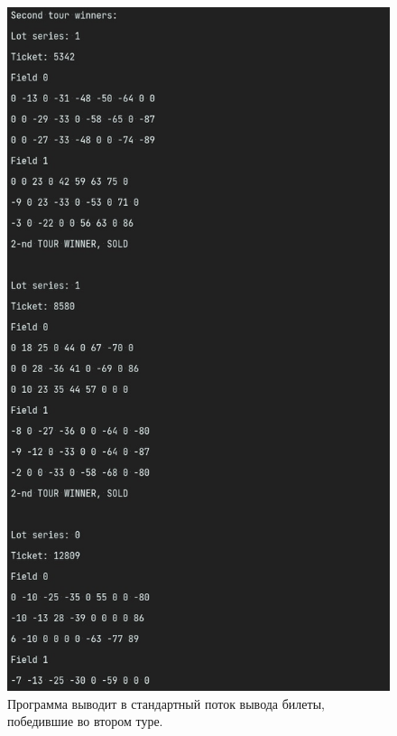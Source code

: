 \documentclass[a4paper,14pt]{article}
\begin{document}
\begin{figure}[H]
  \includegraphics[width=\linewidth]{pictures/4}
  \caption{Программа выводит в стандартный поток вывода билеты, победившие во втором туре.}
\end{figure}
\end{document}

